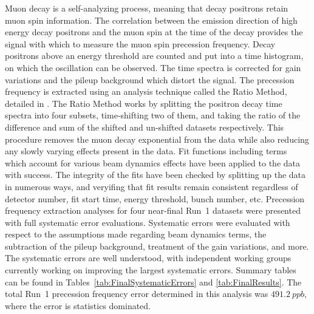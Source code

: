 Muon decay is a self-analyzing process, meaning that decay positrons retain muon spin information. The correlation between the emission direction of high energy decay positrons and the muon spin at the time of the decay provides the signal with which to measure the muon spin precession frequency. Decay positrons above an energy threshold are counted and put into a time histogram, on which the \wa oscillation can be observed. The time spectra is corrected for gain variations and the pileup background which distort the \gmtwo signal. The precession frequency is extracted using an analysis technique called the Ratio Method, detailed in . The Ratio Method works by splitting the positron decay time spectra into four subsets, time-shifting two of them, and taking the ratio of the difference and sum of the shifted and un-shifted datasets respectively. This procedure removes the muon decay exponential from the data while also reducing any slowly varying effects present in the data. Fit functions including terms which account for various beam dynamics effects have been applied to the data with success. The integrity of the fits have been checked by splitting up the data in numerous ways, and veryifing that fit results remain consistent regardless of detector number, fit start time, energy threshold, bunch number, etc. Precession frequency extraction analyses for four near-final Run~1 datasets were presented with full systematic error evaluations. Systematic errors were evaluated with respect to the assumptions made regarding beam dynamics terms, the subtraction of the pileup background, treatment of the gain variations, and more. The systematic errors are well understood, with independent working groups currently working on improving the largest systematic errors. Summary tables can be found in Tables~\ref{tab:FinalSystematicErrors} and \ref{tab:FinalResults}. The total Run~1 precession frequency error determined in this analysis was $\SI{491.2}{ppb}$, where the error is statistics dominated.


